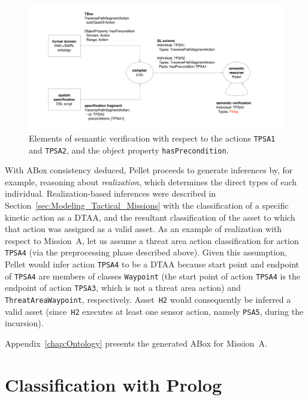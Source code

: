 \begin{figure}[ht]
\centering
\includegraphics[width=\textwidth]{img/semantic-verification.pdf}
\caption[Semantic verification]{Elements of semantic verification with respect to the actions \texttt{TPSA1} and \texttt{TPSA2}, and the object property \texttt{hasPrecondition}.}
\label{fig:semantic_verification}
\end{figure}

With ABox consistency deduced, Pellet proceeds to generate inferences by, for example, reasoning about \emph{realization}, which determines the direct types of each individual. Realization-based inferences were described in Section~\ref{sec:Modeling_Tactical_Missions} with the classification of a specific kinetic action as a DTAA, and the resultant classification of the asset to which that action was assigned as a valid asset. As an example of realization with respect to Mission~A, let us assume a threat area action classification for action \texttt{TPSA4} (via the preprocessing phase described above). Given this assumption, Pellet would infer action \texttt{TPSA4} to be a DTAA because start point and endpoint of \texttt{TPSA4} are members of classes \texttt{Waypoint} (the start point of action \texttt{TPSA4} is the endpoint of action \texttt{TPSA3}, which is not a threat area action) and \texttt{ThreatAreaWaypoint}, respectively. Asset~\texttt{H2} would consequently be inferred a valid asset (since~\texttt{H2} executes at least one sensor action, namely \texttt{PSA5}, during the incursion).

Appendix~\ref{chap:Ontology} presents the generated ABox for Mission~A.

\section{Classification with Prolog}
\label{sec:Classification_with_Prolog}

